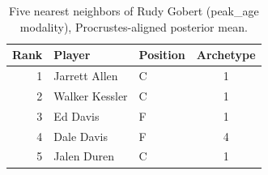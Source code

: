 \begin{table}[htbp]
  \centering\small
  \begin{tabular}{rllc}
    \toprule
    Rank & Player & Position & Archetype \\
    \midrule
    1 & Jarrett Allen & C & 1 \\
    2 & Walker Kessler & C & 1 \\
    3 & Ed Davis & F & 1 \\
    4 & Dale Davis & F & 4 \\
    5 & Jalen Duren & C & 1 \\
    \bottomrule
  \end{tabular}
  \caption{Five nearest neighbors of Rudy Gobert (peak_age modality), Procrustes-aligned posterior mean.}
  \label{tab:Rudy_Gobert_neighbors_peak_age}
\end{table}

